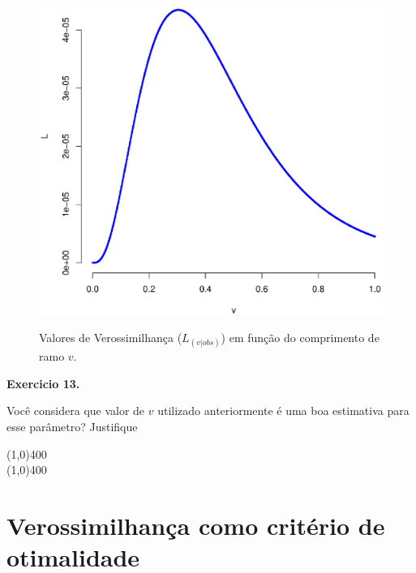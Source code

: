 \begin{refsection}
  \begin{figure}[h!]
       \centering
      {\includegraphics[scale=0.55]{figures/tut12/plot_3.eps}}
      {\caption{Valores de Verossimilhança ($L_{(v|obs)}$) em função do comprimento de ramo $v$.}\label{fig:plot3}}
  \end{figure}


\begin{blackBlock}{\textbf{Exercicio 13.}}\label{tut12:ex:13.3}

Você considera que valor de $v$ utilizado anteriormente é uma boa estimativa para esse parâmetro? Justifique

\end{blackBlock}

\begin{center}
\line(1,0){400}\\
\line(1,0){400}\\
\end{center}


\section{Verossimilhança como critério de otimalidade} \label{tut12:first_sec}


\end{refsection}

